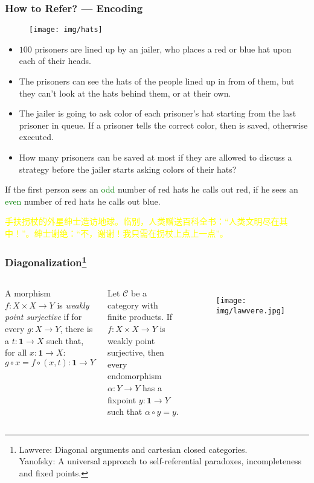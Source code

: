 \documentclass[UTF8,aspectratio=43,11pt,colorlinks,compress,openany]{beamer}%
\begin{document}
\begin{frame}\frametitle{How to Refer? --- Encoding}
	\begin{figure}
		\texttt{[image: img/hats]}
	\end{figure}
	\begin{itemize}
		\item $100$ prisoners are lined up by an jailer, who places a red or blue hat upon each of their heads.
		\item The prisoners can see the hats of the people lined up in from of them, but they can't look at the hats behind them, or at their own.
		\item The jailer is going to ask color of each prisoner's hat starting from the last prisoner in queue. If a prisoner tells the correct color, then is saved, otherwise executed.
		\item How many prisoners can be saved at most if they are allowed to discuss a strategy before the jailer starts asking colors of their hats?
	\end{itemize}
	\begin{block}{} 
		If the first person sees an \textcolor{green}{odd} number of red hats he calls out red, if he sees an \textcolor{green}{even} number of red hats he calls out blue.
	\end{block}
\begin{block}{}
\small \textcolor{yellow}{手扶拐杖的外星绅士造访地球。临别，人类赠送百科全书：“人类文明尽在其中！”。绅士谢绝：“不，谢谢！我只需在拐杖上点上一点”。}
\end{block}
\end{frame}

\begin{frame}\frametitle{Diagonalization\footnote{\tiny Lawvere: Diagonal arguments and cartesian closed categories.\\
Yanofsky: A universal approach to self-referential paradoxes, incompleteness and fixed points.}}
\setlength\abovedisplayskip{0pt}
\setlength\belowdisplayskip{0pt}
\begin{columns}
\begin{definition}
A morphism $f: X\times X\to Y$ is \emph{weakly point surjective} if for every $g: X\to Y$, there is a $t: \mathbf{1}\to X$ such that, for all $x: \mathbf{1}\to X$:
\[g\circ x=f\circ(x,t): \mathbf{1}\to Y\]
\end{definition}
	\begin{theorem}
		Let $\mathcal{C}$ be a category with finite products. If $f: X\times X\to Y$ is weakly point surjective, then every endomorphism $\alpha: Y\to Y$ has a fixpoint $y:\mathbf{1}\to Y$ such that $\alpha\circ y=y$.
	\end{theorem}
	\begin{figure}
		\texttt{[image: img/lawvere.jpg]}
	\end{figure}
\end{columns}
\end{frame}
\end{document}
